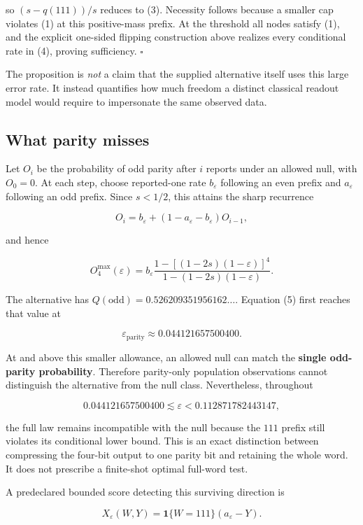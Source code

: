 \documentclass[
  10pt,
  a4paper,
]{article}
\begin{document}
so \((s-q(111))/s\) reduces to (3). Necessity follows because a smaller cap violates (1) at this positive-mass prefix. At the threshold all nodes satisfy (1), and the explicit one-sided flipping construction above realizes every conditional rate in (4), proving sufficiency. \(\square\)

The proposition is \emph{not} a claim that the supplied alternative itself uses this large error rate. It instead quantifies how much freedom a distinct classical readout model would require to impersonate the same observed data.

\subsection{What parity misses}\label{what-parity-misses}

Let \(O_i\) be the probability of odd parity after \(i\) reports under an allowed null, with \(O_0=0\). At each step, choose reported-one rate \(b_\varepsilon\) following an even prefix and \(a_\varepsilon\) following an odd prefix. Since \(s<1/2\), this attains the sharp recurrence

\[
 O_i=b_\varepsilon+(1-a_\varepsilon-b_\varepsilon)O_{i-1},
\]

and hence

\[
 O_4^{\max}(\varepsilon)
 =b_\varepsilon\frac{1-[(1-2s)(1-\varepsilon)]^4}
 {1-(1-2s)(1-\varepsilon)}.\tag{5}
\]

The alternative has \(Q(\text{odd})=0.526209351956162\ldots\). Equation (5) first reaches that value at

\[
 \boxed{\varepsilon_{\mathrm{parity}}\approx0.044121657500400.}\tag{6}
\]

At and above this smaller allowance, an allowed null can match the \textbf{single odd-parity probability}. Therefore parity-only population observations cannot distinguish the alternative from the null class. Nevertheless, throughout

\[
 0.044121657500400\lesssim\varepsilon<0.112871782443147,
\]

the full law remains incompatible with the null because the \(111\) prefix still violates its conditional lower bound. This is an exact distinction between compressing the four-bit output to one parity bit and retaining the whole word. It does not prescribe a finite-shot optimal full-word test.

A predeclared bounded score detecting this surviving direction is

\[
 X_\varepsilon(W,Y)=\mathbf1\{W=111\}(a_\varepsilon-Y).
\]
\end{document}
